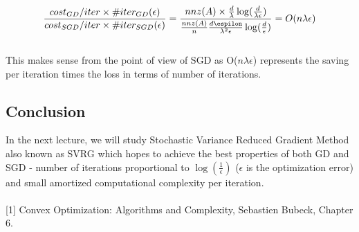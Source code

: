 \documentclass[12pt]{report}
\begin{document}
\begin{equation}
\frac{cost_{GD}/iter \times \# iter_{GD}(\epsilon) }{cost_{SGD}/iter\times \# iter_{SGD}(\epsilon)} = \frac{nnz(A)\times\frac{d}{\lambda}\log(\frac{d}{\lambda\epsilon})}{\frac{nnz(A)}{n}\frac{d\espilon}{\lambda^2 \epsilon}\log(\frac{d}{\epsilon})} = O(n\lambda\epsilon) 
\end{equation}\\

This makes sense from the point of view of SGD as O($n\lambda\epsilon$) represents the saving per iteration times the loss in terms of number of iterations.

\subsection{Conclusion}
In the next lecture, we will study Stochastic Variance Reduced Gradient Method also known as SVRG which hopes to achieve the best properties of both GD and SGD - number of iterations proportional to $\log(\frac{1}{\epsilon})$ ($\epsilon$ is the optimization error) and small amortized computational complexity per iteration.
\\
\\

[1] Convex Optimization: Algorithms and Complexity, Sebastien Bubeck, Chapter 6.
\end{document}
